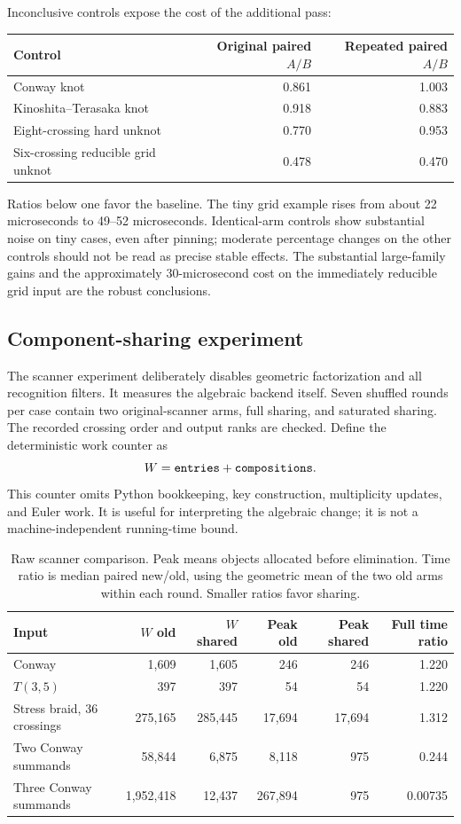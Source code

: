 Inconclusive controls expose the cost of the additional pass:
\begin{center}\small
\begin{tabular}{@{}lrr@{}}
\toprule
Control & Original paired $A/B$ & Repeated paired $A/B$\\
\midrule
Conway knot & 0.861 & 1.003\\
Kinoshita--Terasaka knot & 0.918 & 0.883\\
Eight-crossing hard unknot & 0.770 & 0.953\\
Six-crossing reducible grid unknot & 0.478 & 0.470\\
\bottomrule
\end{tabular}
\end{center}
Ratios below one favor the baseline. The tiny grid example rises from about
22 microseconds to 49--52 microseconds. Identical-arm controls show
substantial noise on tiny cases, even after pinning; moderate percentage
changes on the other controls should not be read as precise stable effects.
The substantial large-family gains and the approximately 30-microsecond
cost on the immediately reducible grid input are the robust conclusions.

\subsection{Component-sharing experiment}
The scanner experiment deliberately disables geometric factorization and
all recognition filters. It measures the algebraic backend itself. Seven
shuffled rounds per case contain two original-scanner arms, full sharing,
and saturated sharing. The recorded crossing order and output ranks are
checked. Define the deterministic work counter as
\[
 W=\texttt{entries}+\texttt{compositions}.
\]
This counter omits Python bookkeeping, key construction, multiplicity
updates, and Euler work. It is useful for interpreting the algebraic change;
it is not a machine-independent running-time bound.

\begin{table}[htbp]
\centering\small
\begin{tabular}{@{}lrrrrr@{}}
\toprule
Input & $W$ old & $W$ shared & Peak old & Peak shared & Full time ratio\\
\midrule
Conway & 1,609 & 1,605 & 246 & 246 & 1.220\\
$T(3,5)$ & 397 & 397 & 54 & 54 & 1.220\\
Stress braid, 36 crossings & 275,165 & 285,445 & 17,694 & 17,694 & 1.312\\
Two Conway summands & 58,844 & 6,875 & 8,118 & 975 & 0.244\\
Three Conway summands & 1,952,418 & 12,437 & 267,894 & 975 & 0.00735\\
\bottomrule
\end{tabular}
\caption{Raw scanner comparison. Peak means objects allocated before
elimination. Time ratio is median paired new/old, using the geometric mean
of the two old arms within each round. Smaller ratios favor sharing.}
\label{tab:sharing}
\end{table}

